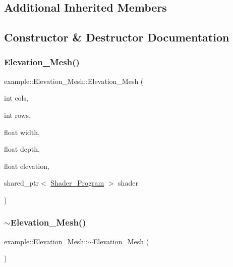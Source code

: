 \subsection*{Additional Inherited Members}


\subsection{Constructor \& Destructor Documentation}
\mbox{\label{classexample_1_1_elevation___mesh_a631c220a9e5c04f1c84b5301329c3791}} 
\subsubsection{\texorpdfstring{Elevation\+\_\+\+Mesh()}{Elevation\_Mesh()}}
{\footnotesize\ttfamily example\+::\+Elevation\+\_\+\+Mesh\+::\+Elevation\+\_\+\+Mesh (\begin{DoxyParamCaption}\item[{int}]{cols,  }\item[{int}]{rows,  }\item[{float}]{width,  }\item[{float}]{depth,  }\item[{float}]{elevation,  }\item[{shared\+\_\+ptr$<$ \mbox{\hyperlink{classexample_1_1_shader___program}{Shader\+\_\+\+Program}} $>$}]{shader }\end{DoxyParamCaption})}

\mbox{\label{classexample_1_1_elevation___mesh_a64aaa59bc4b872cf5180e444d3cb1073}} 
\subsubsection{\texorpdfstring{$\sim$\+Elevation\+\_\+\+Mesh()}{~Elevation\_Mesh()}}
{\footnotesize\ttfamily example\+::\+Elevation\+\_\+\+Mesh\+::$\sim$\+Elevation\+\_\+\+Mesh (\begin{DoxyParamCaption}{ }\end{DoxyParamCaption})}



